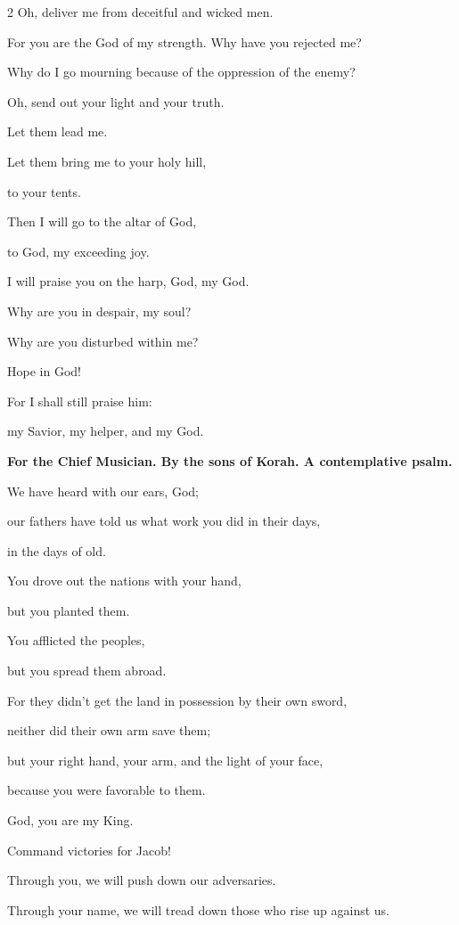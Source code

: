 \begin{multicols}{2}
	Oh, deliver me from deceitful and wicked men.
	
	
	\myverse{}For you are the God of my strength. Why have you rejected me?
	
	Why do I go mourning because of the oppression of the enemy?
	
	
	\myverse{}Oh, send out your light and your truth.
	
	Let them lead me.
	
	Let them bring me to your holy hill,
	
	to your tents.
	
	
	\myverse{}Then I will go to the altar of God,
	
	to God, my exceeding joy.
	
	I will praise you on the harp, God, my God.
	
	
	\myverse{}Why are you in despair, my soul?
	
	Why are you disturbed within me?
	
	Hope in God!
	
	For I shall still praise him:
	
	my Savior, my helper, and my God.
	
	
	\mychapter{}\textbf{For the Chief Musician. By the sons of Korah. A contemplative psalm.}
	
	\myverse*{}We have heard with our ears, God;
	
	our fathers have told us what work you did in their days,
	
	in the days of old.
	
	
	\myverse{}You drove out the nations with your hand,
	
	but you planted them.
	
	You afflicted the peoples,
	
	but you spread them abroad.
	
	
	\myverse{}For they didn’t get the land in possession by their own sword,
	
	neither did their own arm save them;
	
	but your right hand, your arm, and the light of your face,
	
	because you were favorable to them.
	
	
	\myverse{}God, you are my King.
	
	Command victories for Jacob!
	
	
	\myverse{}Through you, we will push down our adversaries.
	
	Through your name, we will tread down those who rise up against us.
	

\end{multicols}
